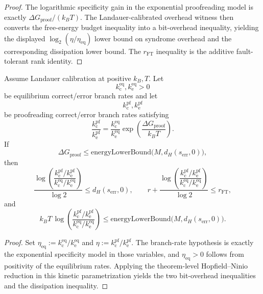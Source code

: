 \begin{proof}
The logarithmic specificity gain in the exponential proofreading model is exactly $\Delta G_{\mathrm{proof}}/(k_B T)$. The Landauer-calibrated overhead witness then converts the free-energy budget inequality into a bit-overhead inequality, yielding the displayed $\log_2(\eta/\eta_{\mathrm{eq}})$ lower bound on syndrome overhead and the corresponding dissipation lower bound. The $r_{\mathrm{FT}}$ inequality is the additive fault-tolerant rank identity.
\end{proof}

\begin{theorem}\label{thm:hopfield-ninio-kinetic-branch}
Assume Landauer calibration at positive $k_B,T$. Let
\[
k_{\mathrm c}^{\mathrm{eq}},k_{\mathrm e}^{\mathrm{eq}} > 0
\]
be equilibrium correct/error branch rates and let
\[
k_{\mathrm c}^{\mathrm{pf}},k_{\mathrm e}^{\mathrm{pf}}
\]
be proofreading correct/error branch rates satisfying
\[
\frac{k_{\mathrm c}^{\mathrm{pf}}}{k_{\mathrm e}^{\mathrm{pf}}}
=
\frac{k_{\mathrm c}^{\mathrm{eq}}}{k_{\mathrm e}^{\mathrm{eq}}}
\exp\!\left(\frac{\Delta G_{\mathrm{proof}}}{k_B T}\right).
\]
If
\[
\Delta G_{\mathrm{proof}}
\le
\mathrm{energyLowerBound}\bigl(M,d_H(s_{\mathrm{err}},0)\bigr),
\]
then
\[
\frac{\log\!\left(\dfrac{k_{\mathrm c}^{\mathrm{pf}}/k_{\mathrm e}^{\mathrm{pf}}}
{k_{\mathrm c}^{\mathrm{eq}}/k_{\mathrm e}^{\mathrm{eq}}}\right)}{\log 2}
\le d_H(s_{\mathrm{err}},0),
\qquad
r +
\frac{\log\!\left(\dfrac{k_{\mathrm c}^{\mathrm{pf}}/k_{\mathrm e}^{\mathrm{pf}}}
{k_{\mathrm c}^{\mathrm{eq}}/k_{\mathrm e}^{\mathrm{eq}}}\right)}{\log 2}
\le r_{\mathrm{FT}},
\]
and
\[
k_B T\,\log\!\left(\frac{k_{\mathrm c}^{\mathrm{pf}}/k_{\mathrm e}^{\mathrm{pf}}}
{k_{\mathrm c}^{\mathrm{eq}}/k_{\mathrm e}^{\mathrm{eq}}}\right)
\le
\mathrm{energyLowerBound}\bigl(M,d_H(s_{\mathrm{err}},0)\bigr).
\]
\end{theorem}

\begin{proof}
Set $\eta_{\mathrm{eq}} := k_{\mathrm c}^{\mathrm{eq}}/k_{\mathrm e}^{\mathrm{eq}}$ and $\eta := k_{\mathrm c}^{\mathrm{pf}}/k_{\mathrm e}^{\mathrm{pf}}$. The branch-rate hypothesis is exactly the exponential specificity model in those variables, and $\eta_{\mathrm{eq}}>0$ follows from positivity of the equilibrium rates. Applying the theorem-level Hopfield--Ninio reduction in this kinetic parametrization yields the two bit-overhead inequalities and the dissipation inequality.
\end{proof}

